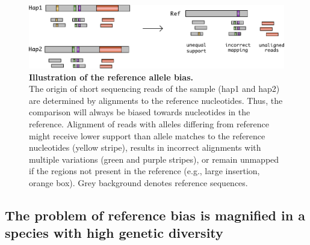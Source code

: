 \documentclass[../main.tex]{subfiles}
\begin{document}
\bigskip

\begin{figure}[!htb]
    \centering
    \includegraphics[width=\textwidth]{intro/fig2.pdf}
        \vspace{3mm}
        \caption[Illustration of the reference allele bias]{\textbf{Illustration of the reference allele bias.} \\
        \footnotesize{The origin of short sequencing reads of the sample (hap1 and hap2) are determined by alignments to the reference nucleotides. Thus, the comparison will always be biased towards nucleotides in the reference. Alignment of reads with alleles differing from reference might receive lower support than allele matches to the reference nucleotides (yellow stripe), results in incorrect alignments with multiple variations (green and purple stripes), or remain unmapped if the regions not present in the reference (e.g., large insertion, orange box). Grey background denotes reference sequences.}}
        \label{fig12:bias}
\end{figure}

\subsection{The problem of reference bias is magnified in a species with high genetic diversity}
\end{document}
